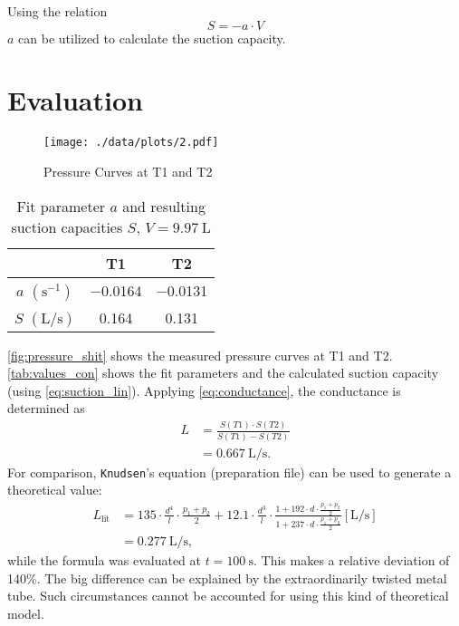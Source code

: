 Using the relation
\begin{equation}\label{eq:suction_lin}
	S=-a\cdot V
\end{equation}
$a$ can be utilized to calculate the suction capacity.

\section{Evaluation}
\begin{figure}[tbp]
	\centering
	\texttt{[image: ./data/plots/2.pdf]}
	\caption[Pressure Curves for T1 and T2]{Pressure Curves at T1 and T2}
	\label{fig:pressure_shit}
\end{figure}
\begin{table}[tbp]
	\centering
	\caption[Fit parameters and suction capacities]{Fit parameter $a$ and resulting suction capacities $S$, $V=\SI{9.97}{\liter}$}
	\label{tab:values_con}
	\begin{tabular}{S|SS}
		\toprule
		{}&	{T1}&	{T2}\\
		\midrule
		{$a$ $(\si{\second}^{-1})$}	&	\num{-0.0164}	&	\num{-0.0131}	\\
		{$S$ $(\si{\liter\per\second})$}	&	0.164	&	0.131	\\
		\bottomrule
	\end{tabular}
\end{table}
\autoref{fig:pressure_shit} shows the measured pressure curves at T1 and T2.
\autoref{tab:values_con} shows the fit parameters and the calculated suction capacity (using \autoref{eq:suction_lin}).
Applying \autoref{eq:conductance}, the conductance is determined as
\begin{align*}
	L &= \frac{S(T1)\cdot S(T2)}{S(T1)-S(T2)} \\
		&= \SI{0.667}{\liter\per\second}.
\end{align*}
For comparison, \texttt{Knudsen}'s equation (preparation file) can be used to generate a theoretical value:
\begin{align*}
	L_\text{lit} &= 135\cdot\frac{d^4}{l}\cdot\frac{p_1+p_2}{2}+\num{12.1}\cdot\frac{d^3}{l}\cdot\frac{1+192\cdot d\cdot\frac{p_1+p_2}{2}}{1+237\cdot d\cdot\frac{p_1+p_2}{2}} \left[\si{\liter\per\second}\right]	\\
	&=\SI{0.277}{\liter\per\second},
\end{align*}
while the formula was evaluated at $t=\SI{100}{\second}$.
This makes a relative deviation of \num{140}\%.
The big difference can be explained by the extraordinarily twisted metal tube.
Such circumstances cannot be accounted for using this kind of theoretical model.
